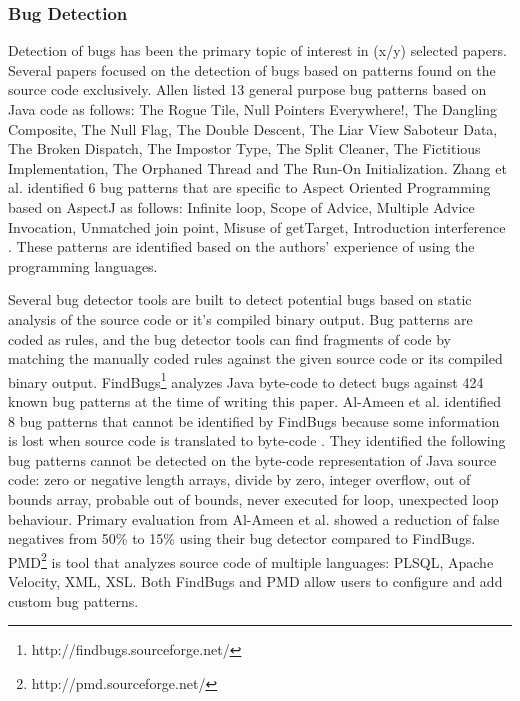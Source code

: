 \documentclass[conference]{IEEEtran}
\begin{document}
\subsubsection{Bug Detection} Detection of bugs has been the primary topic of interest in (x/y) selected papers. Several papers focused on the detection of bugs based on patterns found on the source code exclusively. Allen listed 13 general purpose bug patterns based on Java code as follows: The Rogue Tile, Null Pointers Everywhere!, The Dangling Composite, The Null Flag, The Double Descent, The Liar View Saboteur Data, The Broken Dispatch, The Impostor Type, The Split Cleaner, The Fictitious Implementation, The Orphaned Thread and The Run-On Initialization\cite{bug_patterns_allen}. Zhang et al. identified 6 bug patterns that are specific to Aspect Oriented Programming based on AspectJ as follows: Infinite loop, Scope of Advice, Multiple Advice Invocation, Unmatched join point, Misuse of getTarget, Introduction interference \cite{on_identifying_zhang}. These patterns are identified based on the authors' experience of using the programming languages.

Several bug detector tools are built to detect potential bugs based on static analysis of the source code or it's compiled binary output. Bug patterns are coded as rules, and the bug detector tools can find fragments of code by matching the manually coded rules against the given source code or its compiled binary output. FindBugs\footnote{http://findbugs.sourceforge.net/} analyzes Java byte-code to detect bugs against 424 known bug patterns at the time of writing this paper. Al-Ameen et al. identified 8 bug patterns that cannot be identified by FindBugs because some information is lost when source code is translated to byte-code \cite{making_al_ameen}. They identified the following bug patterns cannot be detected on the byte-code representation of Java source code: zero or negative length arrays, divide by zero, integer overflow, out of bounds array, probable out of bounds, never executed for loop, unexpected loop behaviour. Primary evaluation from Al-Ameen et al. showed a reduction of false negatives from 50\% to 15\% using their bug detector compared to FindBugs. PMD\footnote{http://pmd.sourceforge.net/} is tool that analyzes source code of multiple languages: PLSQL, Apache Velocity, XML, XSL. Both FindBugs and PMD allow users to configure and add custom bug patterns.
\end{document}
